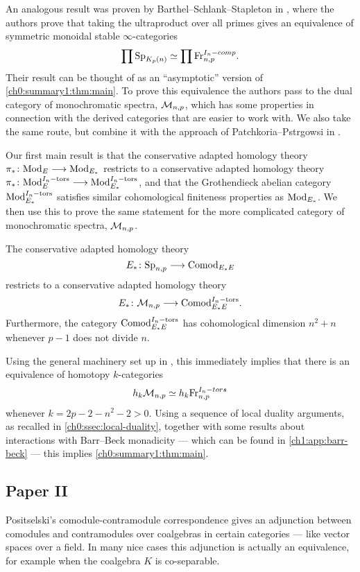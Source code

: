 An analogous result was proven by Barthel--Schlank--Stapleton in \cite{barthel-schlank-stapleton_2021}, where the authors prove that taking the ultraproduct over all primes gives an equivalence of symmetric monoidal stable $\infty$-categories 
\[\prod \mathrm{Sp}_{{K_p(n)}} \simeq \prod \mathrm{Fr}_{n,p}^{I_n-comp}.\]
Their result can be thought of as an ``asymptotic'' version of \cref{ch0:summary1:thm:main}. To prove this equivalence the authors pass to the dual category of monochromatic spectra, $\mathcal{M}_{n,p}$, which has some properties in connection with the derived categories that are easier to work with. We also take the same route, but combine it with the approach of Patchkoria--Pstr\a{}gowsi in \cite{patchkoria-pstragowski_2021}. 

Our first main result is that the conservative adapted homology theory $\pi_* \colon \mathrm{Mod}_{E} \longrightarrow \mathrm{Mod}_{E_*}$ restricts to a conservative adapted homology theory $\pi_* \colon \mathrm{Mod}_{E}^{I_n-\mathrm{tors}}\longrightarrow \mathrm{Mod}_{E_*}^{I_n-\mathrm{tors}}$, and that the Grothendieck abelian category $\mathrm{Mod}_{E_*}^{I_n-\mathrm{tors}}$ satisfies similar cohomological finiteness properties as $\mathrm{Mod}_{E_*}$. We then use this to prove the same statement for the more complicated category of monochromatic spectra, $\mathcal{M}_{n,p}$. 

\begin{theorem}
    The conservative adapted homology theory 
    \[E_*\colon \mathrm{Sp}_{n,p}\longrightarrow \mathrm{Comod}_{E_*E}\]
    restricts to a conservative adapted homology theory 
    \[E_*\colon \mathcal{M}_{n,p}\longrightarrow \mathrm{Comod}_{E_*E}^{I_n-\mathrm{tors}}.\] 
    Furthermore, the category $\mathrm{Comod}_{E_*E}^{I_n-\mathrm{tors}}$ has cohomological dimension $n^2+n$ whenever $p-1$ does not divide $n$. 
\end{theorem}

Using the general machinery set up in \cite{patchkoria-pstragowski_2021}, this immediately implies that there is an equivalence of homotopy $k$-categories
\[h_k \mathcal{M}_{n,p} \simeq h_k\mathrm{Fr}_{n,p}^{I_n-tors}\]
whenever $k= 2p-2-n^2-2>0$. Using a sequence of local duality arguments, as recalled in \cref{ch0:ssec:local-duality}, together with some results about interactions with Barr--Beck monadicity --- which can be found in \cref{ch1:app:barr-beck} --- this implies \cref{ch0:summary1:thm:main}. 




\subsection{Paper II}

Positselski's comodule-contramodule correspondence gives an adjunction between comodules and contramodules over coalgebras in certain categories --- like vector spaces over a field. In many nice cases this adjunction is actually an equivalence, for example when the coalgebra $K$ is co-separable. 

